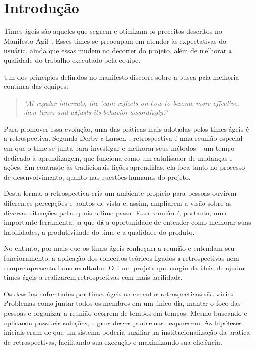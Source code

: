 \section{Introdução}
Times ágeis são aqueles que seguem e otimizam os preceitos descritos no Manifesto Ágil~\cite{manifesto}. Esses times se preocupam em atender às expectativas do usuário, ainda que essas mudem no decorrer do projeto, além de melhorar a qualidade do trabalho executado pela equipe.

Um dos princípios definidos no manifesto discorre sobre a busca pela melhoria contínua das equipes:

\begin{quote}
	\textit{``At regular intervals, the team reflects on how to become more effective, then tunes and adjusts its behavior accordingly.''}~\cite{manifesto}
\end{quote}

Para promover essa evolução, uma das práticas mais adotadas pelos times ágeis é a retrospectiva. Segundo Derby e Larsen~\cite{retrospectives}, retrospectiva é uma reunião especial em que o time se junta para investigar e melhorar seus métodos -- um tempo dedicado à aprendizagem, que funciona como um catalisador de mudanças e ações. Em contraste às tradicionais lições aprendidas, ela foca tanto no processo de desenvolvimento, quanto nas questões humanas do projeto.

Desta forma, a retrospectiva cria um ambiente propício para pessoas ouvirem diferentes percepções e pontos de vista e, assim, ampliarem a visão sobre as diversas situações pelas quais o time passa. Essa reunião é, portanto, uma importante ferramenta, já que dá a oportunidade de entender como melhorar suas habilidades, a produtividade do time e a qualidade do produto.

No entanto, por mais que os times ágeis conheçam a reunião e entendam seu funcionamento, a aplicação dos conceitos teóricos ligados a retrospectivas nem sempre apresenta bons resultados. O \suricato{} é um projeto que surgiu da ideia de ajudar times ágeis a realizarem retrospectivas com mais facilidade.

Os desafios enfrentados por times ágeis ao executar retrospectivas são vários. Problemas como juntar todos os membros em um único dia, manter o foco das pessoas e organizar a reunião ocorrem de tempos em tempos. Mesmo buscando e aplicando possíveis soluções, alguns desses problemas reaparecem. As hipóteses iniciais eram de que um sistema poderia auxiliar na institucionalização da prática de retrospectivas, facilitando sua execução e maximizando sua eficiência.

